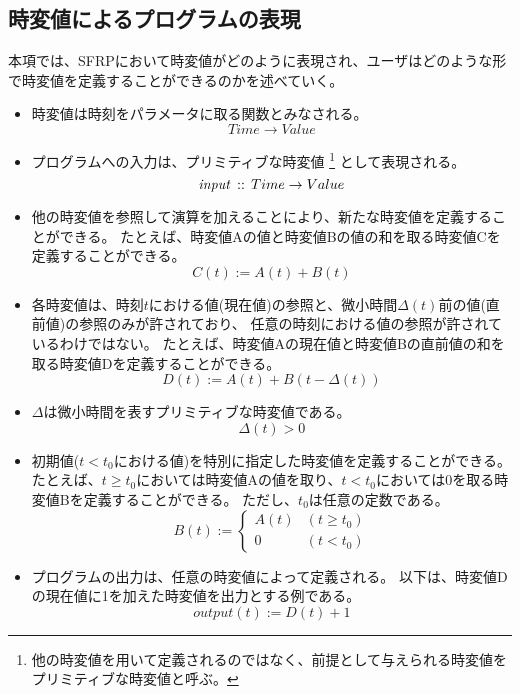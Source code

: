 \subsection{時変値によるプログラムの表現}\label{sec:language:model:program}
本項では、SFRPにおいて時変値がどのように表現され、ユーザはどのような形で時変値を定義することができるのかを述べていく。

\begin{itemize}
  \item
  時変値は時刻をパラメータに取る関数とみなされる。
  \begin{equation*}
    Time \rightarrow Value
  \end{equation*}

  \item
  プログラムへの入力は、プリミティブな時変値
  \footnote{他の時変値を用いて定義されるのではなく、前提として与えられる時変値をプリミティブな時変値と呼ぶ。}
  として表現される。
  \begin{equation*}
    {\it input} \, :: \, Time \rightarrow Value
  \end{equation*}

  \item
  他の時変値を参照して演算を加えることにより、新たな時変値を定義することができる。
  たとえば、時変値Aの値と時変値Bの値の和を取る時変値Cを定義することができる。
  \begin{equation*}
    C(t) := A(t) + B(t)
  \end{equation*}

  \item
  各時変値は、時刻$t$における値(現在値)の参照と、微小時間$ \Delta(t) $前の値(直前値)の参照のみが許されており、
  任意の時刻における値の参照が許されているわけではない。
  たとえば、時変値Aの現在値と時変値Bの直前値の和を取る時変値Dを定義することができる。
  \begin{equation*}
    D(t) := A(t) + B(t - \Delta(t))
  \end{equation*}

  \item
  $ \Delta $は微小時間を表すプリミティブな時変値である。
  \begin{equation*}
    \Delta(t) > 0
  \end{equation*}

  \item
  初期値($ t < t_0 $における値)を特別に指定した時変値を定義することができる。
  たとえば、$t \geq t_0$においては時変値Aの値を取り、$t < t_0$においては0を取る時変値Bを定義することができる。
  ただし、$t_0$は任意の定数である。
  \begin{equation*}
    B(t) := \begin{cases}
      A(t) & (t \geq t_0) \\
      0 & (t < t_0)
    \end{cases}
  \end{equation*}

  \item
  プログラムの出力は、任意の時変値によって定義される。
  以下は、時変値Dの現在値に1を加えた時変値を出力とする例である。
  \begin{equation*}
    output(t) := D(t) + 1
  \end{equation*}
\end{itemize}

